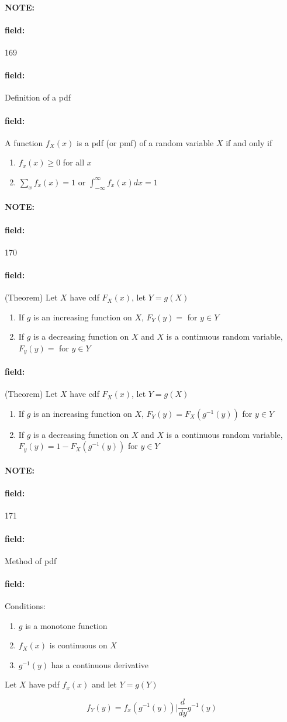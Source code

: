 \documentclass[12pt]{article}
\newenvironment{note}{\paragraph{NOTE:}}{}
\newenvironment{field}{\paragraph{field:}}{}
\begin{document}
\begin{note} \begin{field} \tiny 169 \end{field}
  \begin{field}
    Definition of a pdf
  \end{field}
  \begin{field}
    A function $f_X(x)$ is a pdf (or pmf) of a random variable $X$ if and only if
    \begin{enumerate}
      \item $f_x(x) \geq 0$ for all $x$
      \item $\sum_x f_x(x) = 1$ or $\int_{-\infty}^\infty f_x(x) dx = 1$
    \end{enumerate}
  \end{field}
\end{note}


\begin{note} \begin{field} \tiny 170 \end{field}
  \begin{field}
    (Theorem) Let $X$ have cdf $F_X(x)$, let $Y = g(X)$
    \begin{enumerate}
      \item If $g$ is an increasing function on $X$, $F_Y(y) = $ for $y \in Y$
      \item If $g$ is a decreasing function on $X$ and $X$ is a continuous random variable, $F_y(y) = $ for $y \in Y$
    \end{enumerate}
  \end{field}
  \begin{field}
    (Theorem) Let $X$ have cdf $F_X(x)$, let $Y = g(X)$
    \begin{enumerate}
      \item If $g$ is an increasing function on $X$, $F_Y(y) = F_X(g^{-1}(y))$ for $y \in Y$
      \item If $g$ is a decreasing function on $X$ and $X$ is a continuous random variable, $F_y(y) = 1 - F_X(g^{-1}(y))$ for $y \in Y$
    \end{enumerate}
  \end{field}
\end{note}


\begin{note} \begin{field} \tiny 171 \end{field}
  \begin{field}
    Method of pdf
  \end{field}
  \begin{field}
    Conditions:
    \begin{enumerate}
      \item $g$ is a monotone function
      \item $f_X(x)$ is continuous on $X$
      \item $g^{-1}(y)$ has a continuous derivative
    \end{enumerate}
    Let $X$ have pdf $f_x(x)$ and let $Y = g(Y)$

    $$f_Y(y) = f_x(g^{-1}(y))\big|\frac{d}{dy}g^{-1}(y)$$
  \end{field}
\end{note}
\end{document}
